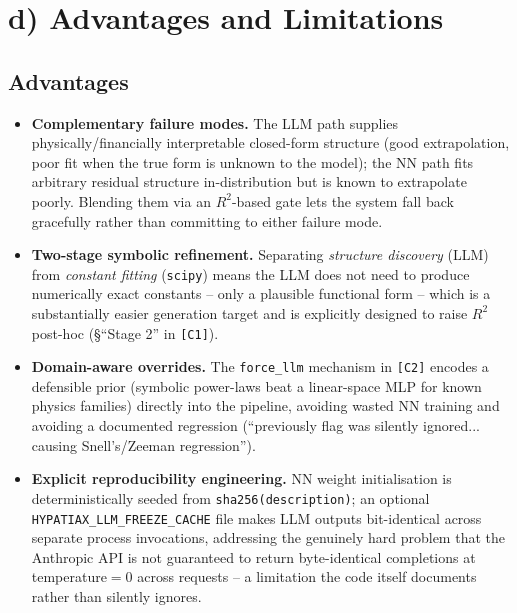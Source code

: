 \documentclass[11pt,a4paper]{article}
\newcommand{\code}[1]{\texttt{\small #1}}
\begin{document}
\section{d) Advantages and Limitations}

\subsection{Advantages}
\begin{itemize}
  \item \textbf{Complementary failure modes.} The LLM path supplies
        physically/financially interpretable closed-form structure (good
        extrapolation, poor fit when the true form is unknown to the
        model); the NN path fits arbitrary residual structure
        in-distribution but is known to extrapolate poorly. Blending them
        via an $R^2$-based gate lets the system fall back gracefully rather
        than committing to either failure mode.
  \item \textbf{Two-stage symbolic refinement.} Separating \emph{structure
        discovery} (LLM) from \emph{constant fitting} (\code{scipy}) means
        the LLM does not need to produce numerically exact constants --
        only a plausible functional form -- which is a substantially
        easier generation target and is explicitly designed to raise
        $R^2$ post-hoc (\S ``Stage 2'' in \code{[C1]}).
  \item \textbf{Domain-aware overrides.} The \code{force\_llm} mechanism in
        \code{[C2]} encodes a defensible prior (symbolic power-laws beat a
        linear-space MLP for known physics families) directly into the
        pipeline, avoiding wasted NN training and avoiding a documented
        regression (``previously flag was silently ignored... causing
        Snell's/Zeeman regression'').
  \item \textbf{Explicit reproducibility engineering.} NN weight
        initialisation is deterministically seeded from
        \code{sha256(description)}; an optional
        \code{HYPATIAX\_LLM\_FREEZE\_CACHE} file makes LLM outputs
        bit-identical across separate process invocations, addressing the
        genuinely hard problem that the Anthropic API is not guaranteed to
        return byte-identical completions at temperature$=0$ across
        requests -- a limitation the code itself documents rather than
        silently ignores.

\end{itemize}
\end{document}
